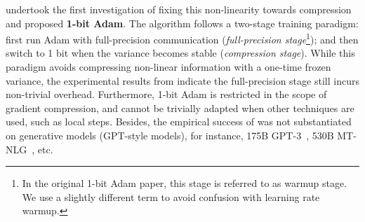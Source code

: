 \citet{tang20211} undertook the first investigation of fixing this non-linearity towards compression and proposed \textbf{1-bit Adam}. The algorithm follows a two-stage training paradigm: first run Adam with full-precision communication (\emph{full-precision stage}\footnote{In the original 1-bit Adam paper, this stage is referred to as warmup stage. We use a slightly different term to avoid confusion with learning rate warmup.}); and then switch to 1 bit when the variance becomes stable (\emph{compression stage}).
While this paradigm avoids compressing non-linear information with a one-time frozen variance,
the experimental results from \citep{tang20211} indicate the full-precision stage still incurs non-trivial overhead. 
Furthermore, 1-bit Adam is restricted in the scope of gradient compression, and cannot be trivially adapted when other techniques are used, such as local steps. Besides, the empirical success of \citep{tang20211} was not substantiated on generative models (GPT-style models), for instance, 175B GPT-3~\cite{gpt-3}, 530B MT-NLG~\cite{mt-nlg}, etc.




